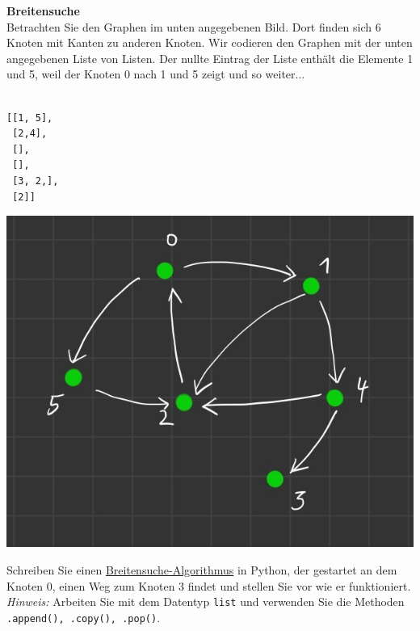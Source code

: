 \textbf{Breitensuche}\\
Betrachten Sie den Graphen im unten angegebenen Bild. Dort finden sich 6 Knoten mit Kanten zu anderen Knoten. Wir codieren den Graphen mit der unten angegebenen Liste von Listen.
Der nullte Eintrag der Liste enthält die Elemente 1 und 5, weil der Knoten 0 nach 1 und 5 zeigt und so weiter...\\~\\
\vspace{.5cm}
\begin{minipage}{.45\textwidth}
\begin{verbatim}
[[1, 5],
 [2,4],
 [],
 [],
 [3, 2,],
 [2]]
\end{verbatim} 
\end{minipage}
\begin{minipage}{.45\textwidth}
	\begin{center}
		\includegraphics[scale=.2]{BreadthFirstSearch/BreadthFirstSearch.jpg}
	\end{center}
\end{minipage}


Schreiben Sie einen \href{https://de.wikipedia.org/wiki/Breitensuche}{Breitensuche-Algorithmus} in Python, der gestartet an dem Knoten 0, einen Weg zum Knoten 3 findet und stellen Sie vor wie er funktioniert.\\

\textit{Hinweis:} Arbeiten Sie mit dem Datentyp \texttt{list} und verwenden Sie die Methoden \texttt{.append(), .copy(), .pop()}.
